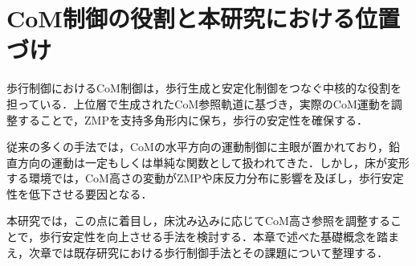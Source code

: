 \section{CoM制御の役割と本研究における位置づけ}

歩行制御におけるCoM制御は，歩行生成と安定化制御をつなぐ中核的な役割を担っている．上位層で生成されたCoM参照軌道に基づき，実際のCoM運動を調整することで，ZMPを支持多角形内に保ち，歩行の安定性を確保する．

従来の多くの手法では，CoMの水平方向の運動制御に主眼が置かれており，鉛直方向の運動は一定もしくは単純な関数として扱われてきた．しかし，床が変形する環境では，CoM高さの変動がZMPや床反力分布に影響を及ぼし，歩行安定性を低下させる要因となる．

本研究では，この点に着目し，床沈み込みに応じてCoM高さ参照を調整することで，歩行安定性を向上させる手法を検討する．本章で述べた基礎概念を踏まえ，次章では既存研究における歩行制御手法とその課題について整理する．